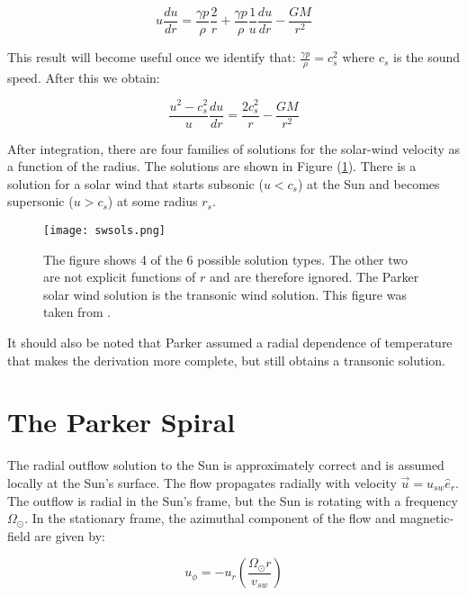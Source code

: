 \documentclass[%
 reprint,
 amsmath,amssymb,
 aps,
]{revtex4-1}
\begin{document}
\begin{equation}
u \frac{du}{dr} = \frac{\gamma p}{\rho} \frac{2}{r} + \frac{\gamma p}{\rho}\frac{1}{u} \frac{du}{dr} - \frac{GM}{r^2}
\end{equation}

This result will become useful once we identify that: $\displaystyle \frac{\gamma p}{\rho} = c^2 _s$ where $c_s$ is the sound speed. After this we obtain:

\begin{equation}
\frac{u^2 - c^2 _s}{u} \frac{du}{dr} = \frac{2 c^2 _s}{r} - \frac{GM}{r^2}
\end{equation}

After integration, there are four families of solutions for the solar-wind velocity as a function of the radius. The solutions are shown in Figure (\ref{swsols}). There is a solution for a solar wind that starts subsonic  ($u<c_s$) at the Sun and becomes supersonic ($u>c_s$) at some radius $r_s$.

\begin{center}
\begin{figure}[h] 
\texttt{[image: swsols.png]}
\caption{The figure shows 4 of the 6 possible solution types. The other two are not explicit functions of $r$ and are therefore ignored. The Parker solar wind solution is the transonic wind solution. This figure was taken from \cite{swsolsfig}. \label{swsols}}
\end{figure}
\end{center}

It should also be noted that Parker assumed a radial dependence of temperature that makes the derivation more complete, but still obtains a transonic solution.

\section{The Parker Spiral}
The radial outflow solution to the Sun is approximately correct and is assumed locally at the Sun's surface. The flow propagates radially with velocity $\vec{u} = u_{sw} \hat e _r$. The outflow is radial in the Sun's frame, but the Sun is rotating with a frequency $\Omega_{\odot}$. In the stationary frame, the azimuthal component of the flow and magnetic-field are given by:

\begin{equation}
u_{\phi} = - u_r ( \frac{\Omega_{\odot} r}{v_{sw}} )
\end{equation}
\end{document}
